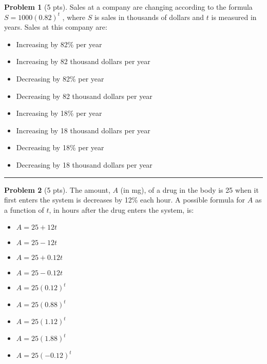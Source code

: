 \documentclass[12pt]{article}
\makeatletter
\theoremstyle{definition}
\newtheorem{problem}{Problem}
\newcommand*{\radiobutton}{%
  \@ifstar{\@radiobutton0}{\@radiobutton1}%
}
\newcommand*{\@radiobutton}[1]{%
  \begin{tikzpicture}
    \pgfmathsetlengthmacro\radius{height("X")/2}
    \draw[radius=\radius] circle;
    \ifcase#1 \fill[radius=.6*\radius] circle;\fi
  \end{tikzpicture}%
}
\makeatother
\begin{document}
\bigskip
\begin{problem}[5 pts]
  Sales at a company are changing according to the formula $S = 1000 (0.82)^t$ , where $S$ is sales in thousands of
  dollars and $t$ is measured in years. Sales at this company are: 
  \begin{itemize}
  \item[\radiobutton] Increasing by 82\% per year
  \item[\radiobutton] Increasing by 82 thousand dollars per year
  \item[\radiobutton] Decreasing by 82\% per year
  \item[\radiobutton] Decreasing by 82 thousand dollars per year
  \item[\radiobutton] Increasing by 18\% per year
  \item[\radiobutton] Increasing by 18 thousand dollars per year
  \item[\radiobutton] Decreasing by 18\% per year
  \item[\radiobutton] Decreasing by 18 thousand dollars per year
  \end{itemize} 
\end{problem}
\hrule

\begin{problem}[5 pts]
  The amount, $A$ (in mg), of a drug in the body is 25 when it first enters the system is decreases by 12\% each hour. A
  possible formula for $A$ as a function of $t$, in hours after the drug enters the system, is:
  \begin{itemize}
  \item[\radiobutton] $A=25+12t$
  \item[\radiobutton] $A=25-12t$
  \item[\radiobutton] $A=25+0.12t$
  \item[\radiobutton] $A=25-0.12t$
  \item[\radiobutton] $A=25(0.12)^t$
  \item[\radiobutton] $A=25(0.88)^t$
  \item[\radiobutton] $A=25(1.12)^t$
  \item[\radiobutton] $A=25(1.88)^t$
  \item[\radiobutton] $A=25(-0.12)^t$
  \end{itemize}
\end{problem}
\end{document}
